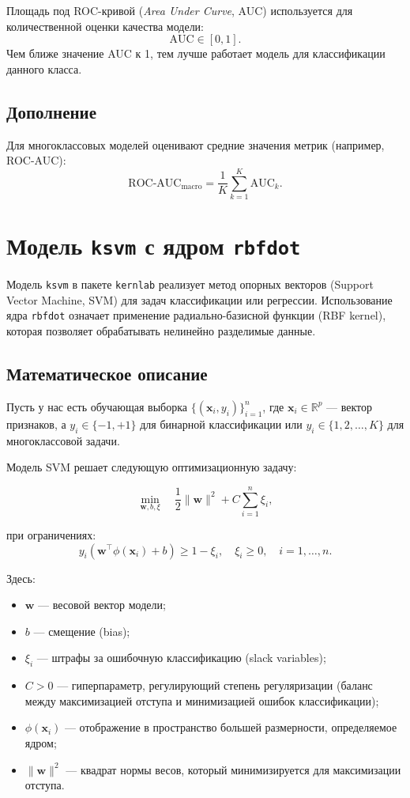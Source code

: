 Площадь под ROC-кривой (\textit{Area Under Curve}, AUC) используется для количественной оценки качества модели: 
\[
\text{AUC} \in [0, 1].
\]
Чем ближе значение AUC к 1, тем лучше работает модель для классификации данного класса.

\subsection{Дополнение}
Для многоклассовых моделей оценивают средние значения метрик (например, ROC-AUC):
\[
\text{ROC-AUC}_{\text{macro}} = \frac{1}{K} \sum_{k=1}^K \text{AUC}_k.
\]

\section{Модель \texttt{ksvm} с ядром \texttt{rbfdot}}

Модель \texttt{ksvm} в пакете \texttt{kernlab} реализует метод опорных векторов (Support Vector Machine, SVM) для задач классификации или регрессии. Использование ядра \texttt{rbfdot} означает применение радиально-базисной функции (RBF kernel), которая позволяет обрабатывать нелинейно разделимые данные.

\subsection{Математическое описание}
Пусть у нас есть обучающая выборка \( \{(\mathbf{x}_i, y_i)\}_{i=1}^n \), где \( \mathbf{x}_i \in \mathbb{R}^p \) — вектор признаков, а \( y_i \in \{-1, +1\} \) для бинарной классификации или \( y_i \in \{1, 2, \dots, K\} \) для многоклассовой задачи.

Модель SVM решает следующую оптимизационную задачу:

\[
\min_{\mathbf{w}, b, \xi} \quad \frac{1}{2} \|\mathbf{w}\|^2 + C \sum_{i=1}^n \xi_i,
\]

при ограничениях:
\[
y_i \left( \mathbf{w}^\top \phi(\mathbf{x}_i) + b \right) \geq 1 - \xi_i, \quad \xi_i \geq 0, \quad i = 1, \dots, n.
\]

Здесь:
\begin{itemize}
	\item \( \mathbf{w} \) — весовой вектор модели;
	\item \( b \) — смещение (bias);
	\item \( \xi_i \) — штрафы за ошибочную классификацию (slack variables);
	\item \( C > 0 \) — гиперпараметр, регулирующий степень регуляризации (баланс между максимизацией отступа и минимизацией ошибок классификации);
	\item \( \phi(\mathbf{x}_i) \) — отображение в пространство большей размерности, определяемое ядром;
	\item \( \|\mathbf{w}\|^2 \) — квадрат нормы весов, который минимизируется для максимизации отступа.
\end{itemize}

